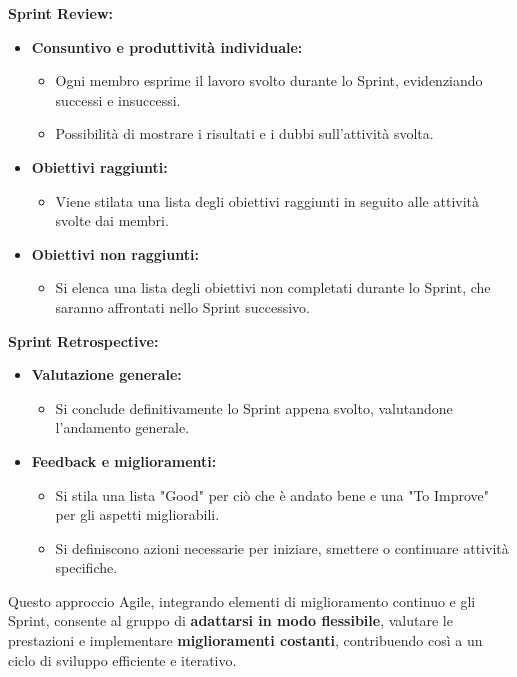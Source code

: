\documentclass{article}
\begin{document}
\textbf{Sprint Review:}
\begin{itemize}
    \item \textbf{Consuntivo e produttività individuale:}
    \begin{itemize}
        \item Ogni membro esprime il lavoro svolto durante lo Sprint, evidenziando successi e insuccessi.
        \item Possibilità di mostrare i risultati e i dubbi sull'attività svolta.
    \end{itemize}
    \item \textbf{Obiettivi raggiunti:}
    \begin{itemize}
        \item Viene stilata una lista degli obiettivi raggiunti in seguito alle attività svolte dai membri.
    \end{itemize}
    \item \textbf{Obiettivi non raggiunti:}
    \begin{itemize}
        \item Si elenca una lista degli obiettivi non completati durante lo Sprint, che saranno affrontati nello Sprint successivo.
    \end{itemize}
\end{itemize}

\textbf{Sprint Retrospective:}
\begin{itemize}
    \item \textbf{Valutazione generale:}
    \begin{itemize}
        \item Si conclude definitivamente lo Sprint appena svolto, valutandone l'andamento generale.
    \end{itemize}
    \item \textbf{Feedback e miglioramenti:}
    \begin{itemize}
        \item Si stila una lista "Good" per ciò che è andato bene e una "To Improve" per gli aspetti migliorabili.
        \item Si definiscono azioni necessarie per iniziare, smettere o continuare attività specifiche.
    \end{itemize}
\end{itemize}

Questo approccio Agile, integrando elementi di miglioramento continuo e gli Sprint, consente al gruppo di \textbf{adattarsi in modo flessibile}, valutare le prestazioni e implementare \textbf{miglioramenti costanti}, contribuendo così a un ciclo di sviluppo efficiente e iterativo.
\end{document}
